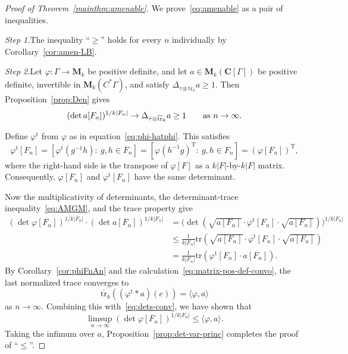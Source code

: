 \documentclass[12pt,a4paper]{article}
\numberwithin{equation}{section}
\theoremstyle{remark}
\renewcommand{\rm}[1]{\mathrm{#1}}
\newcommand{\bbC}{\mathbf{C}}
\newcommand{\rmM}{\mathbf{M}}
\newcommand{\G}{\Gamma}
\renewcommand{\phi}{\varphi}
\newcommand{\tr}{\overline{\mathrm{tr}}}
\newcommand{\Tr}{\mathrm{tr}}
\begin{document}
\begin{proof}[Proof of Theorem~\ref{mainthm:amenable}]
We prove~\eqref{eq:amenable} as a pair of inequalities.

\vspace{7pt}

\emph{Step 1.}\quad The inequality ``$\ge$'' holds for every $n$ individually by Corollary~\ref{cor:amen-LB}.

\vspace{7pt}

\emph{Step 2.}\quad Let $\phi:\G\to\rmM_k$ be positive definite, and let $a\in \rmM_k(\bbC[\G])$ be positive definite, invertible in $\rmM_k(C^\ast \G)$, and satisfy $\Delta_{\tau\otimes \tr_k} a \ge 1$.  Then Proposition~\ref{prop:Den} gives
\begin{equation}\label{eq:dets-conv}
(\det a[F_n])^{1/k|F_n|} \to \Delta_{\tau\otimes \tr_k} a \ge 1\qquad \hbox{as}\ n\to\infty.
\end{equation}

Define $\phi^\rm{t}$ from $\phi$ as in equation~\eqref{eq:phi-hatphi}.  This satisfies
\[\phi^\rm{t}[F_n] = [\phi^\rm{t}(g^{-1}h):\ g,h \in F_n] = [\phi(h^{-1}g)^\rm{T}:\ g,h \in F_n] = (\phi[F_n])^\rm{T},\]
where the right-hand side is the transpose of $\phi[F]$ as a $k|F|$-by-$k|F|$ matrix.  Consequently, $\phi[F_n]$ and $\phi^\rm{t}[F_n]$ have the same determinant.

Now the multiplicativity of determinants, the determinant-trace inequality~\eqref{eq:AMGM}, and the trace property give
\begin{align*}
(\det \phi[F_n])^{1/k|F_n|}\cdot (\det a[F_n])^{1/k|F_n|} 
&= \big(\det (\sqrt{a[F_n]}\cdot \phi^\rm{t}[F_n]\cdot \sqrt{a[F_n]})\big)^{1/k|F_n|} \\
&\le \frac{1}{k|F_n|}\Tr (\sqrt{a[F_n]}\cdot \phi^\rm{t}[F_n]\cdot \sqrt{a[F_n]})\\
&= \frac{1}{k|F_n|}\Tr (\phi^\rm{t}[F_n]\cdot a[F_n]).
\end{align*}
By Corollary~\ref{cor:phiFnAn} and the calculation~\eqref{eq:matrix-pos-def-convo}, the last normalized trace converges to
\[\tr_k((\phi^\rm{t}\ast a)(e)) = \langle \phi,a\rangle\]
as $n\to\infty$. Combining this with~\eqref{eq:dets-conv}, we have shown that
\[\limsup_{n\to\infty} (\det \phi[F_n])^{1/k|F_n|} \le \langle \phi,a\rangle.\]
Taking the infimum over $a$, Proposition~\ref{prop:det-var-princ} completes the proof of ``$\le$''.
\end{proof}
\end{document}
